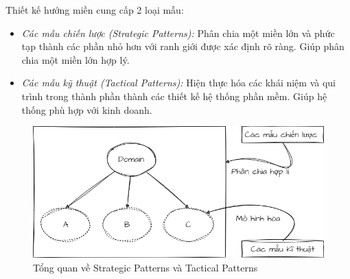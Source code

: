 Thiết kế hướng miền cung cấp 2 loại mẫu:

\begin{itemize}

\item \emph{Các mẫu chiến lược (Strategic Patterns):} Phân chia một miền lớn và phức tạp thành các phần nhỏ hơn với ranh giới được xác định rõ ràng. Giúp phân chia một miền lớn hợp lý.

\item \emph{Các mẫu kỹ thuật (Tactical Patterns):} Hiện thực hóa các khái niệm và qui trình trong thành phần thành các thiết kế hệ thống phần mềm. Giúp hệ thống phù hợp với kinh doanh.
 
\end{itemize}

\begin{figure}[H]

\centering

\includegraphics[scale = 0.5]{pictures/cac_mau_chien_luoc_va_cac_mau_ky_thuat/main.drawio.png}

\caption{Tổng quan về Strategic Patterns và Tactical Patterns}

\end{figure}
